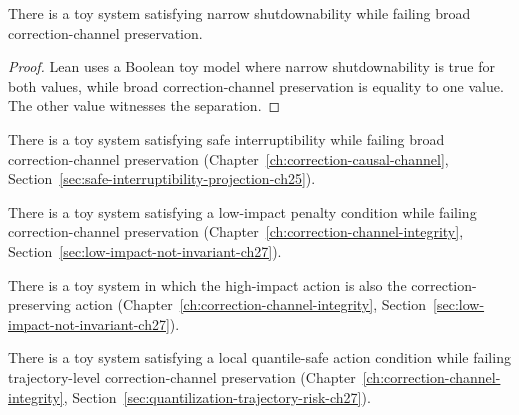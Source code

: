 \begin{theorem}
\label{appi:thm:shutdown-not-corrigibility}
There is a toy system satisfying narrow shutdownability while failing broad correction-channel preservation.
\end{theorem}
\begin{proof}
Lean uses a Boolean toy model where narrow shutdownability is true for both values, while broad correction-channel preservation is equality to one value. The other value witnesses the separation.
\end{proof}

\begin{theorem}
\label{appi:thm:safe-interruptibility-not-correction}
There is a toy system satisfying safe interruptibility while failing broad correction-channel preservation (Chapter~\ref{ch:correction-causal-channel}, Section~\ref{sec:safe-interruptibility-projection-ch25}).
\end{theorem}

\begin{theorem}
\label{appi:thm:low-impact-not-correction}
There is a toy system satisfying a low-impact penalty condition while failing correction-channel preservation (Chapter~\ref{ch:correction-channel-integrity}, Section~\ref{sec:low-impact-not-invariant-ch27}).
\end{theorem}

\begin{theorem}
\label{appi:thm:correction-high-impact}
There is a toy system in which the high-impact action is also the correction-preserving action (Chapter~\ref{ch:correction-channel-integrity}, Section~\ref{sec:low-impact-not-invariant-ch27}).
\end{theorem}

\begin{theorem}
\label{appi:thm:quantilization-not-trajectory-cci}
There is a toy system satisfying a local quantile-safe action condition while failing trajectory-level correction-channel preservation (Chapter~\ref{ch:correction-channel-integrity}, Section~\ref{sec:quantilization-trajectory-risk-ch27}).
\end{theorem}

